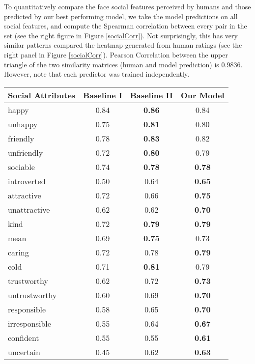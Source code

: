 \documentclass[10pt,twocolumn,letterpaper]{article}
\begin{document}
To quantitatively compare the face social features perceived by humans and those predicted by our best performing model, we take the model predictions on all social features, and compute the Spearman correlation between every pair in the set (see the right figure in Figure \ref{socialCorr}). Not surprisingly, this has very similar patterns compared the heatmap generated from human ratings (see the right panel in Figure \ref{socialCorr}). Pearson Correlation between the upper triangle of the two similarity matrices (human and model prediction) is 0.9836. However, note that each predictor was trained independently.


\begin{center}
\begin{table}[hbt]{\small
\centering 
\begin{tabular}{|l||c|c|c|}
\hline
\textbf{Social Attributes}& \textbf{Baseline I} & \textbf{Baseline II} & \textbf{Our Model}\\
\hline
happy & 0.84 &\textbf{0.86} & 0.84\\ 
\hline
unhappy & 0.75 & \textbf{0.81} & 0.80\\ 
\hline
friendly & 0.78 &\textbf{0.83} & 0.82\\ 
\hline
unfriendly & 0.72 & \textbf{0.80} & 0.79\\ 
\hline
sociable& 0.74 &\textbf{0.78} & \textbf{0.78}\\ 
\hline
introverted& 0.50 & 0.64 & \textbf{0.65}\\ 
\hline
attractive & 0.72 & 0.66 & \textbf{0.75}\\
\hline
unattractive & 0.62 & 0.62& \textbf{0.70}\\
\hline
kind& 0.72 & \textbf{0.79} & \textbf{0.79}\\ 
\hline
mean& 0.69& \textbf{0.75} & 0.73\\ 
\hline
caring& 0.72 & 0.78 & \textbf{0.79}\\
\hline
cold& 0.71 &\textbf{0.81} & 0.79\\
\hline
trustworthy&0.62 & 0.72 & \textbf{0.73}\\
\hline
untrustworthy&0.60 & 0.69 & \textbf{0.70}\\
\hline
responsible&0.58 &0.65 & \textbf{0.70}\\
\hline
irresponsible&0.55 &0.64& \textbf{0.67}\\
\hline
confident&0.55& 0.55& \textbf{0.61}\\
\hline
uncertain&0.45& 0.62 & \textbf{0.63}\\
\hline

\end{tabular}}
\end{table}
\end{center}
\end{document}
